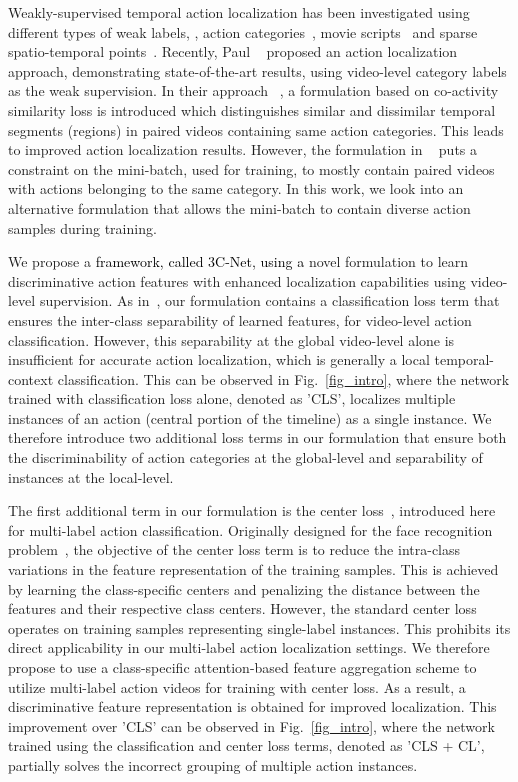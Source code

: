 \documentclass[10pt,twocolumn,letterpaper]{article}
\begin{document}
\vspace{-0.01cm}
Weakly-supervised temporal action localization has been investigated using different types of weak labels, \eg, action categories~\cite{hideseek,untrimnets,stpn}, movie scripts~\cite{TAL-movie-scripts,actor-action} and sparse spatio-temporal points~\cite{point-supervision}. Recently, Paul \etal ~\cite{wtalc} proposed an action localization approach, demonstrating state-of-the-art results, using video-level category labels as the weak supervision.  In their approach ~\cite{wtalc}, a formulation based on co-activity similarity loss is introduced which distinguishes similar and dissimilar temporal segments (regions) in paired videos containing same action categories. This leads to improved action localization results. However, the formulation in ~\cite{wtalc} puts a constraint on the mini-batch, used for training, to mostly contain paired videos with actions belonging to the same category. In this work, we look into an alternative formulation that allows the mini-batch to contain diverse action samples during training. 


We propose a \textcolor{black}{framework, called 3C-Net, using a} novel formulation to learn discriminative action features with enhanced localization capabilities using video-level supervision. As in~\cite{stpn,wtalc}, our formulation contains a classification loss term that ensures the inter-class separability of learned features, for video-level action classification. However, this separability at the global video-level alone is insufficient for accurate action localization, which is generally a local temporal-context classification. This can be observed in Fig.~\ref{fig_intro}, where the network trained with classification loss alone, denoted as 'CLS', localizes multiple instances of an action (central portion of the timeline) as a single instance.
We therefore introduce two additional loss terms in our formulation that ensure both the discriminability of action categories at the global-level and separability of instances at the local-level.

\vspace{-0.01cm}
The first additional term in our formulation is the center loss~\cite{center_loss}, introduced here for multi-label action classification. Originally designed for the face recognition problem~\cite{center_loss}, the objective of the center loss term is to reduce the intra-class variations in the feature representation of the training samples. This is achieved by learning the class-specific centers and penalizing the distance between the features and their respective class centers. However, the standard center loss operates on training samples representing single-label instances. This prohibits its direct applicability in our multi-label action localization settings. We therefore propose to use a class-specific attention-based feature aggregation scheme to utilize multi-label action videos for training with center loss. As a result, a discriminative feature representation is obtained for improved localization. This improvement over 'CLS' can be observed in Fig.~\ref{fig_intro}, where the network trained using the classification and center loss terms, denoted as 'CLS + CL', partially solves the incorrect grouping of multiple action instances. 
\end{document}
